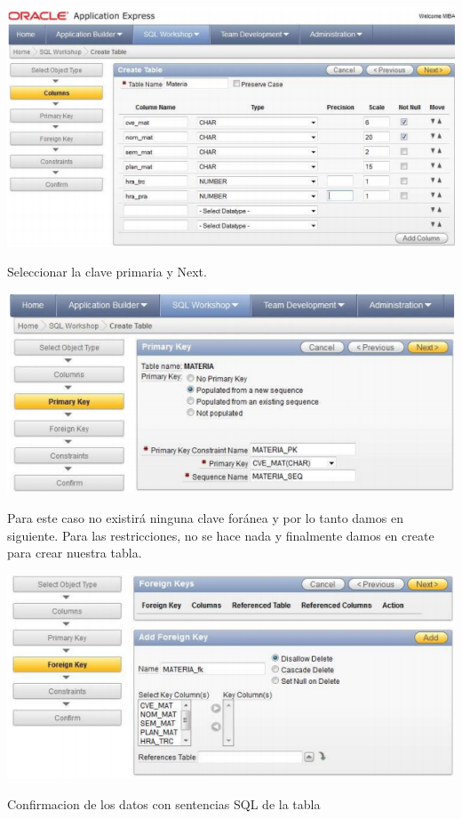 \documentclass[12pt,letterpaper]{article}
\begin{document}
\begin{center}
\includegraphics[width=15cm]{./IMG/img17}
\end{center}
Seleccionar la clave primaria y Next. 
\begin{center}
\includegraphics[width=15cm]{./IMG/img18}
\end{center}
Para este caso no existir\'a ninguna clave for\'anea y por lo tanto damos en
siguiente. Para las restricciones, no se hace nada y finalmente damos en create
para crear nuestra tabla. 
\begin{center}
\includegraphics[width=15cm]{./IMG/img19}
\end{center}
Confirmacion de los datos con sentencias SQL de la tabla
\end{document}
